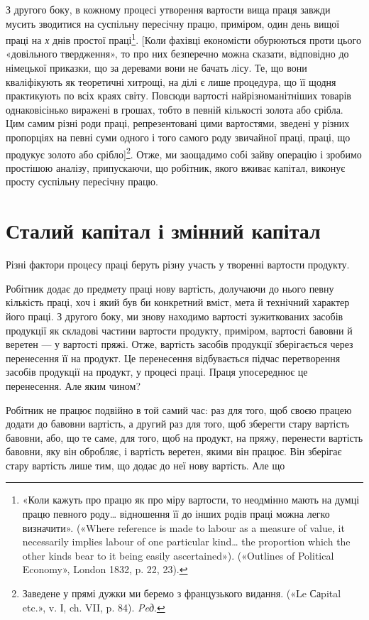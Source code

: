 З другого боку, в кожному процесі утворення вартости вища
праця завжди мусить зводитися на суспільну пересічну працю,
приміром, один день вищої праці на \emph{х} днів простої праці\footnote{
«Коли кажуть про працю як про міру вартости, то неодмінно мають
на думці працю певного роду\dots{} відношення її до інших родів праці можна
легко визначити». («Where reference is made to labour as a measure of
value, it necessarily implies labour of one particular kind\dots{} the proportion
which the other kinds bear to it being easily ascertained»). («Outlines of
Political Economy», London 1832, p. 22, 23).
}. [Коли фахівці економісти обурюються проти цього «довільного твердження»,
то про них безперечно можна сказати, відповідно до
німецької приказки, що за деревами вони не бачать лісу. Те, що
вони кваліфікують як теоретичні хитрощі, на ділі є лише процедура,
що її щодня практикують по всіх краях світу. Повсюди
вартості найрізноманітніших товарів однаковісінько виражені
в грошах, тобто в певній кількості золота або срібла. Цим самим
різні роди праці, репрезентовані цими вартостями, зведені у
різних пропорціях на певні суми одного і того самого роду звичайної
праці, праці, що продукує золото або срібло]\footnote*{
Заведене у прямі дужки ми беремо з французького видання. («Le Саpital
etc.», v. І, ch. VII, p. 84). \emph{Peд}.
}. Отже,
ми заощадимо собі зайву операцію і зробимо простішою аналізу,
припускаючи, що робітник, якого вживає капітал, виконує
просту суспільну пересічну працю.

\section{Сталий капітал і змінний капітал}

Різні фактори процесу праці беруть різну участь у творенні
вартости продукту.

Робітник додає до предмету праці нову вартість, долучаючи
до нього певну кількість праці, хоч і який був би конкретний
вміст, мета й технічний характер його праці. З другого боку, ми
знову находимо вартості зужиткованих засобів продукції як
складові частини вартости продукту, приміром, вартості бавовни
й веретен — у вартості пряжі. Отже, вартість засобів продукції
зберігається через перенесення її на продукт. Це перенесення
відбувається підчас перетворення засобів продукції на продукт,
у процесі праці. Праця упосереднює це перенесення. Але яким
чином?

Робітник не працює подвійно в той самий час: раз для того,
щоб своєю працею додати до бавовни вартість, а другий раз для
того, щоб зберегти стару вартість бавовни, або, що те саме, для
того, щоб на продукт, на пряжу, перенести вартість бавовни, яку
він обробляє, і вартість веретен, якими він працює. Він зберігає
стару вартість лише тим, що додає до неї нову вартість. Але що
\parbreak{}  %
